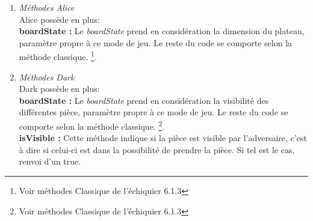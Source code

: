 \documentclass[10pt, a4paper]{article}
\begin{document}
\begin{enumerate}
\item \textit{Méthodes Alice} \\
Alice possède en plus:\\
\textbf{boardState :} Le \textit{boardState} prend en considération la dimension du plateau, paramètre propre à ce mode de jeu. Le reste du code se comporte selon la méthode classique. \footnote{Voir méthodes Classique de l'échiquier 6.1.3}.

\item \textit{Méthodes Dark} \\
Dark possède en plus:\\
\textbf{boardState :}  Le \textit{boardState} prend en considération la visibilité des différentes pièce, paramètre propre à ce mode de jeu. Le reste du code se comporte selon la méthode classique. \footnote{Voir méthodes Classique de l'échiquier 6.1.3}. \\
\textbf{isVisible :} Cette méthode indique si la pièce est visible par l'adversaire, c'est à dire si celui-ci est dans la possibilité de prendre la pièce. Si tel est le cas, renvoi d'un true.
\end{enumerate}
\end{document}
